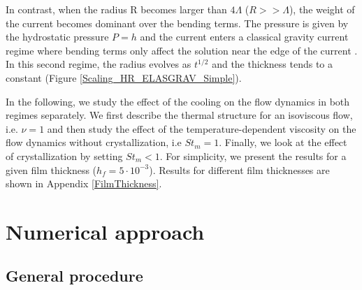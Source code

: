 In  contrast,  when  the  radius  R  becomes  larger  than  $4\Lambda$
($R>>\Lambda$), the  weight of the  current becomes dominant  over the
bending  terms.  The  pressure is  given by  the hydrostatic  pressure
$P =  h$ and  the current  enters a  classical gravity  current regime
where bending  terms only  affect the  solution near  the edge  of the
current  \citep{Huppert:1982a,Michaut:2011kg,Lister:2013ia}.  In  this
second regime, the radius evolves as $t^{1/2}$ and the thickness tends
to a constant (Figure \ref{Scaling_HR_ELASGRAV_Simple}).

In  the following,  we study  the effect  of the  cooling on  the flow
dynamics in both regimes separately. We first describe the thermal
structure  for an  isoviscous flow,  i.e. $\nu=1$  and then  study the
effect  of the  temperature-dependent viscosity  on the  flow dynamics
without crystallization, i.e $St_m =1$. Finally, we look at the effect
of crystallization  by setting  $St_m<1$.  For simplicity,  we present
the results for a  given film thickness ($h_f=5\cdot10^{-3}$). Results
for different film thicknesses are shown in Appendix \ref{FilmThickness}.

\section{Numerical approach}
\label{C3-sec:numerical-approach}

\subsection{General procedure}
\label{sec:general-procedure}

